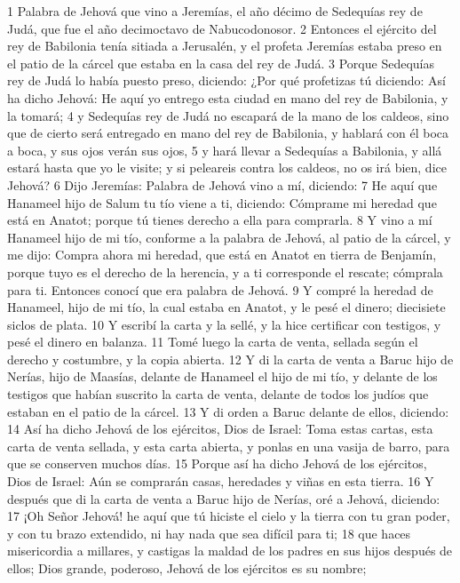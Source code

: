 1 Palabra de Jehová que vino a Jeremías, el año décimo de Sedequías rey de Judá, que fue el año decimoctavo de Nabucodonosor.
2 Entonces el ejército del rey de Babilonia tenía sitiada a Jerusalén, y el profeta Jeremías estaba preso en el patio de la cárcel que estaba en la casa del rey de Judá.
3 Porque Sedequías rey de Judá lo había puesto preso, diciendo: ¿Por qué profetizas tú diciendo: Así ha dicho Jehová: He aquí yo entrego esta ciudad en mano del rey de Babilonia, y la tomará;
4 y Sedequías rey de Judá no escapará de la mano de los caldeos, sino que de cierto será entregado en mano del rey de Babilonia, y hablará con él boca a boca, y sus ojos verán sus ojos,
5 y hará llevar a Sedequías a Babilonia, y allá estará hasta que yo le visite; y si peleareis contra los caldeos, no os irá bien, dice Jehová?
6 Dijo Jeremías: Palabra de Jehová vino a mí, diciendo:
7 He aquí que Hanameel hijo de Salum tu tío viene a ti, diciendo: Cómprame mi heredad que está en Anatot; porque tú tienes derecho a ella para comprarla.
8 Y vino a mí Hanameel hijo de mi tío, conforme a la palabra de Jehová, al patio de la cárcel, y me dijo: Compra ahora mi heredad, que está en Anatot en tierra de Benjamín, porque tuyo es el derecho de la herencia, y a ti corresponde el rescate; cómprala para ti. Entonces conocí que era palabra de Jehová.
9 Y compré la heredad de Hanameel, hijo de mi tío, la cual estaba en Anatot, y le pesé el dinero; diecisiete siclos de plata.
10 Y escribí la carta y la sellé, y la hice certificar con testigos, y pesé el dinero en balanza.
11 Tomé luego la carta de venta, sellada según el derecho y costumbre, y la copia abierta.
12 Y di la carta de venta a Baruc hijo de Nerías, hijo de Maasías, delante de Hanameel el hijo de mi tío, y delante de los testigos que habían suscrito la carta de venta, delante de todos los judíos que estaban en el patio de la cárcel.
13 Y di orden a Baruc delante de ellos, diciendo:
14 Así ha dicho Jehová de los ejércitos, Dios de Israel: Toma estas cartas, esta carta de venta sellada, y esta carta abierta, y ponlas en una vasija de barro, para que se conserven muchos días.
15 Porque así ha dicho Jehová de los ejércitos, Dios de Israel: Aún se comprarán casas, heredades y viñas en esta tierra.
16 Y después que di la carta de venta a Baruc hijo de Nerías, oré a Jehová, diciendo:
17 ¡Oh Señor Jehová! he aquí que tú hiciste el cielo y la tierra con tu gran poder, y con tu brazo extendido, ni hay nada que sea difícil para ti;
18 que haces misericordia a millares, y castigas la maldad de los padres en sus hijos después de ellos; Dios grande, poderoso, Jehová de los ejércitos es su nombre;
